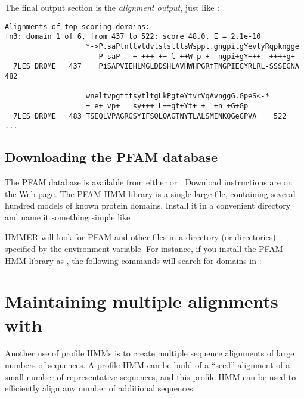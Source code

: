 The final output section is the {\em alignment output}, just like :

{\small\begin{verbatim}
Alignments of top-scoring domains:
fn3: domain 1 of 6, from 437 to 522: score 48.0, E = 2.1e-10
                   *->P.saPtnltvtdvtstsltlsWsppt.gngpitgYevtyRqpkngge
                      P saP   + +++ ++ l ++W p +  ngpi+gY+++  ++++g+ 
  7LES_DROME   437    PiSAPVIEHLMGLDDSHLAVHWHPGRfTNGPIEGYRLRL-SSSEGNA 482  

                   wneltvpgtttsytltgLkPgteYtvrVqAvnggG.GpeS<-*
                   + e+ vp+   sy+++ L++gt+Yt+ +  +n +G+Gp     
  7LES_DROME   483 TSEQLVPAGRGSYIFSQLQAGTNYTLALSMINKQGeGPVA    522  
...
\end{verbatim}}

\subsection{Downloading the PFAM database}

The PFAM database is available from either  or \linebreak 
{}.
Download instructions are on the Web page. The PFAM HMM library is a
single large file, containing several hundred models of known protein
domains. Install it in a convenient directory and name it something
simple like .

HMMER will look for PFAM and other files in a directory (or
directories) specified by the  environment variable.  For
instance, if you install the PFAM HMM library as \linebreak {}, the following commands will search 
for domains in :

\vspace{1.5em}

\section{Maintaining multiple alignments with }

Another use of profile HMMs is to create multiple sequence alignments
of large numbers of sequences. A profile HMM can be build of a
``seed'' alignment of a small number of representative sequences, and
this profile HMM can be used to efficiently align any number of
additional sequences. 

